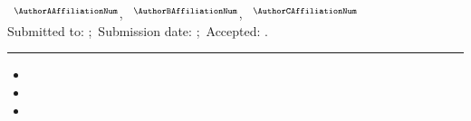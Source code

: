 
{\raggedright
    {\small \sffamily \MakeUppercase{\DocType}}\\[4mm]

    {\Large \sffamily\bfseries \DocTitle}\\[6mm]

    {\normalsize \rmfamily
    \AuthorAName\ \AuthorALastName$^{\AuthorAAffiliationNum\ifdefstring{\AuthorACorresponding}{true}{,\ast}{}}$,
    \AuthorBName\ \AuthorBLastName$^{\AuthorBAffiliationNum\ifdefstring{\AuthorBCorresponding}{true}{,\ast}{}}$,
    \AuthorCName\ \AuthorCLastName$^{\AuthorCAffiliationNum\ifdefstring{\AuthorCCorresponding}{true}{,\ast}{}}$
    }\\[5mm]

    {\footnotesize \sffamily Submitted to: \DocJournal;\ Submission date: \DocSubmissionDate;\ Accepted: \DocAcceptedDate.}\par
}

{\renewcommand{\thefootnote}{}%
}

\vspace{1mm}

\rule{\linewidth}{1pt}

\vspace{4mm}

{\linespread{0.85}\selectfont
\begin{itemize}
    \setlength\itemsep{0mm}
    \item {\footnotesize \sffamily \DocHighlightOne}
    \item {\footnotesize \sffamily \DocHighlightTwo}
    \item {\footnotesize \sffamily \DocHighlightThree}
\end{itemize}
}

